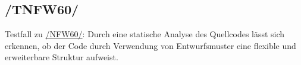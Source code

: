 \subsection*{/TNFW60/}

\label{/TNFW60/} Testfall zu \hyperref[/NFW60/]{/NFW60/}: Durch eine \gls{statische Analyse} des \Gls{Quellcode}s lässt sich erkennen, ob der Code durch Verwendung von Entwurfsmuster eine flexible und erweiterbare Struktur aufweist.

